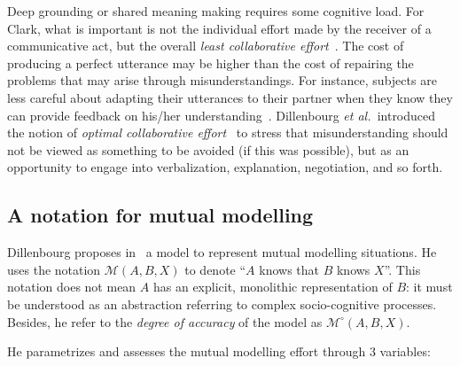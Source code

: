 \documentclass{sig-alternate}
\newcommand{\etal}{{\textit{et al.~}}}
\newcommand{\model}[3]{{$\mathcal{M}(#1, #2, #3)$}}
\newcommand{\Model}[3]{{$\mathcal{M}^{\circ}(#1, #2, #3)$}}
\begin{document}
Deep grounding or shared meaning making requires some cognitive load. For Clark,
what is important is not the individual effort made by the receiver of a
communicative act, but the overall \emph{least collaborative
effort}~\cite{clark1986referring}.  The cost of producing a perfect utterance
may be higher than the cost of repairing the problems that may arise through
misunderstandings. For instance, subjects are less careful about adapting their
utterances to their partner when they know they can provide feedback on his/her
understanding~\cite{schober1993spatial}. Dillenbourg \etal introduced the
notion of \emph{optimal collaborative effort}~\cite{dillenbourg1995evolution} to
stress that misunderstanding should not be viewed as something to be avoided (if
this was possible), but as an opportunity to engage into verbalization,
explanation, negotiation, and so forth.

\subsection{A notation for mutual modelling}
\label{cscl-model}

Dillenbourg proposes in~\cite{sangin2007partner} a model to represent mutual
modelling situations. He uses the notation \model{A}{B}{X} to denote ``$A$ knows
that $B$ knows $X$''. This notation does not mean $A$ has an explicit,
monolithic representation of $B$: it must be understood as an abstraction
referring to complex socio-cognitive processes. Besides, he refer to the
\emph{degree of accuracy} of the model as \Model{A}{B}{X}.

He parametrizes and assesses the mutual modelling effort through 3 variables:
\end{document}
